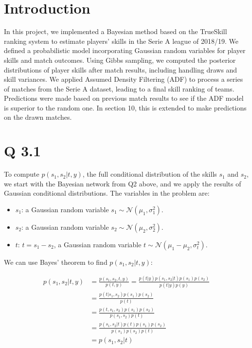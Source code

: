 \section{Introduction}
In this project, we implemented a Bayesian method based on the TrueSkill ranking system to estimate players' skills in the Serie A league of 2018/19. We defined a probabilistic model incorporating Gaussian random variables for player skills and match outcomes. Using Gibbs sampling, we computed the posterior distributions of player skills after match results, including handling draws and skill variances. We applied Assumed Density Filtering (ADF) to process a series of matches from the Serie A dataset, leading to a final skill ranking of teams. Predictions were made based on previous match results to see if the ADF model is superior to the random one. In section 10, this is extended to make predictions on the drawn matches.


\section*{Q 3.1}
To compute $p(s_1, s_2|t, y)$, the full conditional distribution of the skills $s_1$ and $s_2$, we start with the Bayesian network from Q2 above, and we apply the results of Gaussian conditional distributions. The variables in the problem are:

\begin{itemize}
    \item $s_1$: a Gaussian random variable $s_1 \sim \mathcal{N}(\mu_1, \sigma_1^2)$.
    \item $s_2$: a Gaussian random variable $s_2 \sim \mathcal{N}(\mu_2, \sigma_2^2)$.
    \item $t$: $t = s_1 - s_2$, a Gaussian random variable $t \sim \mathcal{N}(\mu_1 - \mu_2, \sigma_t^2)$.
\end{itemize}

We can use Bayes' theorem to find $p(s_1, s_2|t, y)$:

\begin{align*}
    p(s_1, s_2|t, y) &= \frac{p(s_1, s_2, t, y)}{p(t, y)} = \frac{p(t|y) p(s_1, s_2|t) p(s_1) p(s_2)}{p(t|y) p(y)} \\
    &= \frac{p(t|s_1, s_2) p(s_1) p(s_2)}{p(t)} \\
    &= \frac{p(t, s_1, s_2) p(s_1) p(s_2)}{p(s_1, s_2) p(t)} \\
    &= \frac{p(s_1, s_2|t) p(t) p(s_1) p(s_2)}{p(s_1) p(s_2) p(t)} \\
    &= p(s_1, s_2|t)
\end{align*}

